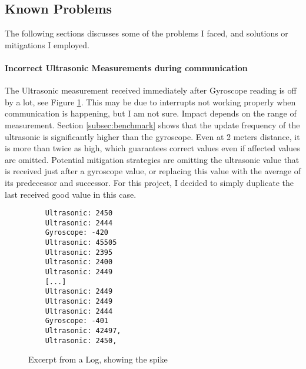 \subsection{Known Problems}

The following sections discusses some of the problems I faced, and solutions or mitigations I employed.


\paragraph{Incorrect Ultrasonic Measurements during \IIC communication}
The Ultrasonic measurement received immediately after Gyroscope reading is off
by a lot, see Figure \ref{fig:log}.
This may be due to interrupts not working properly when \IIC communication is happening, but I am not sure.
Impact depends on the range of measurement. Section \ref{subsec:benchmark} shows that the update frequency of the ultrasonic is significantly higher than the gyroscope. Even at 2 meters distance, it is more than twice as high, which guarantees correct values even if affected values are omitted.
Potential mitigation strategies are omitting the ultrasonic value that is received just after a gyroscope value, or replacing this value with the average of its predecessor and successor.
For this project, I decided to simply duplicate the last received good value in this case.

\begin{figure}
    \begin{minipage}{\textwidth}
        \begin{verbatim}
    Ultrasonic: 2450
    Ultrasonic: 2444
    Gyroscope: -420
    Ultrasonic: 45505
    Ultrasonic: 2395
    Ultrasonic: 2400
    Ultrasonic: 2449
    [...]
    Ultrasonic: 2449
    Ultrasonic: 2449
    Ultrasonic: 2444
    Gyroscope: -401
    Ultrasonic: 42497, 
    Ultrasonic: 2450, 
\end{verbatim}
    \end{minipage}
    \caption{Excerpt from a Log, showing the spike}
    \label{fig:log}
\end{figure}


